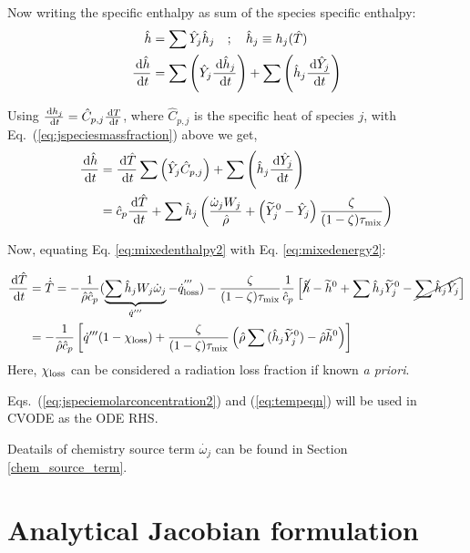 Now writing the specific enthalpy as sum of the species specific enthalpy:
\begin{align} \label{eq:mixedenthalpy}
    \hat{h} &= \sum{\hat{Y}_j \hat{h}_j} \quad ; \quad \hat{h}_j \equiv h_j(\hat{T}) \\
    \frac{\,\mathrm{d}  \hat{h}}{\,\mathrm{d} t} &= \sum{ \left(\hat{Y}_j \frac{\,\mathrm{d}\hat{h}_{j} }{\,\mathrm{d}t} \right) } + \sum{\left( \hat{h}_j \frac{\,\mathrm{d}\hat{Y}_j }{\,\mathrm{d}t} \right)}
\end{align}

Using $\frac{\,\mathrm{d}  h_{j} }{\,\mathrm{d} t} = \hat{C}_{p,j} \frac{\,\mathrm{d}  T }{\,\mathrm{d} t}$, where $\hat{C}_{p,j}$ is the specific heat of species $j$, with Eq.~(\ref{eq:jspeciesmassfraction}) above we get,
\begin{align} \label{eq:mixedenthalpy2}
    \frac{\,\mathrm{d}  \hat{h} }{\,\mathrm{d} t} &= \frac{\,\mathrm{d} \hat{T}}{\,\mathrm{d} t} \sum{\left(\hat{Y}_j \hat{C}_{p,j} \right)} + \sum{\left(\hat{h}_j \frac{\,\mathrm{d}\hat{Y}_j }{\,\mathrm{d}t} \right)} \\
    &=\hat{c}_p \frac{\,\mathrm{d} \hat{T}}{\,\mathrm{d} t} + \sum{\hat{h}_j \left(\frac{\dot{\omega}_j W_j}{\hat{\rho}} + \left( \widetilde{Y}_j^0 - \hat{Y}_j\right) \frac{\zeta}{(1-\zeta) \tau_{\rm mix}} \right)}
\end{align}

Now, equating Eq. \ref{eq:mixedenthalpy2} with Eq. \ref{eq:mixedenergy2}:

\begin{align} \label{eq:tempeqn}
 \frac{\,\mathrm{d} \hat{T} }{\,\mathrm{d} t} &= \dot{\hat{T}} = -\frac{1}{\hat{\rho} \hat{c}_p} (\underbrace{\sum \hat{h}_j W_j \dot{\omega}_j}_{\dot{q}'''} - \dot{q}_{\rm loss}^{'''})  -  \frac{\zeta}{(1-\zeta) \tau_{\rm mix}} \frac{1}{\hat{c}_p}  \left[ \cancel{\hat{h}} - \widetilde{h}^0 + \sum{\hat{h}_j \widetilde{Y}_j^0} - \cancel{\sum{\hat{h}_j \hat{Y}_j}} \right] \\
 &=-\frac{1}{\hat{\rho} \hat{c}_p} \left[ \dot{q}''' (1-\chi_{\rm loss}) +  \frac{\zeta}{(1-\zeta) \tau_{\rm mix}}  \left( \hat{\rho} \sum{(\hat{h}_j \widetilde{Y}_j^0)} - \hat{\rho} \widetilde{h}^0 \right) \right]
\end{align}
Here, $\chi_{\rm loss}$ can be considered a radiation loss fraction if known \emph{a priori}.

Eqs.~(\ref{eq:jspeciemolarconcentration2}) and (\ref{eq:tempeqn}) will be used in CVODE as the ODE RHS.

Deatails of chemistry source term $\dot{{\omega}_j}$ can be found in Section \ref{chem_source_term}.


\section{Analytical Jacobian formulation}
\label{jacobian_mixing_chem}

